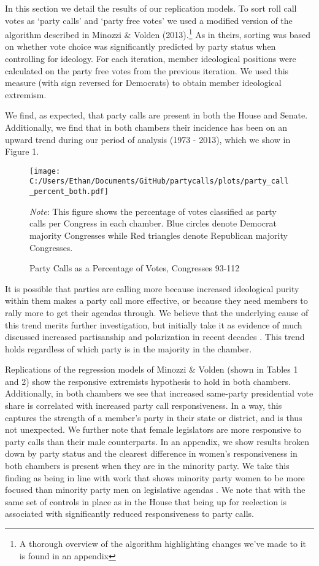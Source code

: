 \documentclass[12pt]{article}
\newcommand\fnote[1]{\captionsetup{font=small}\caption*{#1}}
\begin{document}
In this section we detail the results of our replication models. To sort roll call votes as `party calls' and `party free votes' we used a modified version of the algorithm described in Minozzi \& Volden (2013).\footnote{A thorough overview of the algorithm highlighting changes we've made to it is found in an appendix} As in theirs, sorting was based on whether vote choice was significantly predicted by party status when controlling for ideology. For each iteration, member ideological positions were calculated on the party free votes from the previous iteration. We used this measure (with sign reversed for Democrats) to obtain member ideological extremism. 

We find, as expected, that party calls are present in both the House and Senate. Additionally, we find that in both chambers their incidence has been on an upward trend during our period of analysis (1973 - 2013), which we show in Figure 1. 


\begin{figure}[H]
	\centering
	\caption{Party Calls as a Percentage of Votes, Congresses 93-112}
	\texttt{[image: C:/Users/Ethan/Documents/GitHub/partycalls/plots/party\_call\_percent\_both.pdf]}
	\fnote{\textit{Note}: This figure shows the percentage of votes classified as party calls per Congress in each chamber. Blue circles denote Democrat majority Congresses while Red triangles denote Republican majority Congresses.}
\end{figure}

\noindent
It is possible that parties are calling more because increased ideological purity within them makes a party call more effective, or because they need members to rally more to get their agendas through. We believe that the underlying cause of this trend merits further investigation, but initially take it as evidence of much discussed increased partisanship and polarization in recent decades \cite{Lee:2009, Lee:2016, Theriault:2013, Smith:2014}. This trend holds regardless of which party is in the majority in the chamber.

Replications of the regression models of Minozzi \& Volden (shown in Tables 1 and 2) show the responsive extremists hypothesis to hold in both chambers. Additionally, in both chambers we see that increased same-party presidential vote share is correlated with increased party call responsiveness. In a way, this captures the strength of a member's party in their state or district, and is thus not unexpected. We further note that female legislators are more responsive to party calls than their male counterparts. In an appendix, we show results broken down by party status and the clearest difference in women's responsiveness in both chambers is present when they are in the minority party. We take this finding as being in line with work that shows minority party women to be more focused than minority party men on legislative agendas \cite{Volden:2013}. We note that with the same set of controls in place as in the House that being up for reelection is associated with significantly reduced responsiveness to party calls.
\end{document}
